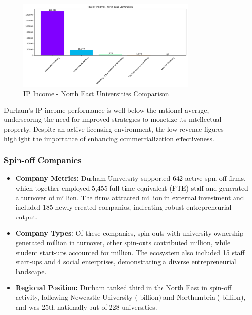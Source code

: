 \documentclass[journal,onecolumn, 10pt,draftclsnofoot]{IEEEtran}
\begin{document}
\begin{figure}[h]
\centering
\includegraphics[width=0.8\textwidth]{Fig/figure26.ip_income_ne_comparison.png}
\caption{IP Income - North East Universities Comparison}
\label{fig:ip-income-ne-comparison}
\end{figure}

Durham's IP income performance is well below the national average, underscoring the need for improved strategies to monetize its intellectual property. Despite an active licensing environment, the low revenue figures highlight the importance of enhancing commercialization effectiveness.

\subsubsection{Spin-off Companies}

\begin{itemize}
    \item \textbf{Company Metrics:} Durham University supported 642 active spin-off firms, which together employed 5,455 full-time equivalent (FTE) staff and generated a turnover of  million. The firms attracted  million in external investment and included 185 newly created companies, indicating robust entrepreneurial output.
    
    \item \textbf{Company Types:} Of these companies, spin-outs with university ownership generated  million in turnover, other spin-outs contributed  million, while student start-ups accounted for  million. The ecosystem also included 15 staff start-ups and 4 social enterprises, demonstrating a diverse entrepreneurial landscape.
    
    \item \textbf{Regional Position:} Durham ranked third in the North East in spin-off activity, following Newcastle University ( billion) and Northumbria ( billion), and was 25th nationally out of 228 universities.
\end{itemize}
\end{document}
